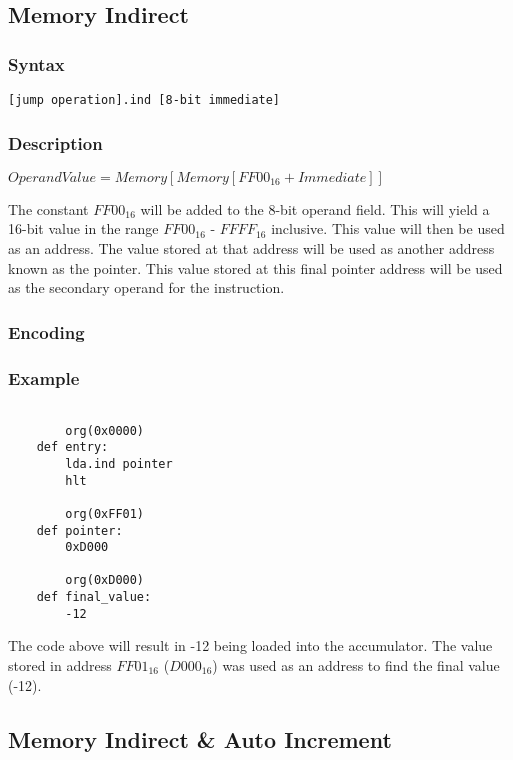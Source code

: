 \subsection{Memory Indirect}\label{subsec:memory-indirect-(ind)}
\subsubsection{Syntax}
\begin{verbatim}[jump operation].ind [8-bit immediate]\end{verbatim}

\subsubsection{Description}
$OperandValue = Memory[Memory[FF00_{16} + Immediate]]$
\par The constant $FF00_{16}$ will be added to the 8-bit operand field.
This will yield a 16-bit value in the range $FF00_{16}$ - $FFFF_{16}$ inclusive.
This value will then be used as an address.
The value stored at that address will be used as another address known as the pointer.
This value stored at this final pointer address will be used as the secondary operand for the instruction.

\subsubsection{Encoding}

\subsubsection{Example}
\begin{verbatim}

        org(0x0000)
    def entry:
        lda.ind pointer
        hlt

        org(0xFF01)
    def pointer:
        0xD000

        org(0xD000)
    def final_value:
        -12

\end{verbatim}
The code above will result in -12 being loaded into the accumulator.
The value stored in address $FF01_{16}$ ($D000_{16}$) was used as an address to find the final value (-12).
\pagebreak

\subsection{Memory Indirect \& Auto Increment}\label{subsec:memory-indirect-&-auto-increment-(inc)}
